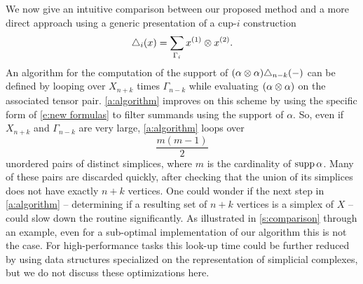 We now give an intuitive comparison between our proposed method and a more direct approach using a generic presentation of a cup-$i$ construction
\[
\triangle_i(x) =
\sum_{\Gamma_i} x^{(1)} \otimes x^{(2)}.
\]
An algorithm for the computation of the support of $(\alpha \otimes \alpha) \triangle_{n-k}(-)$ can be defined by looping over $X_{n+k}$ times $\Gamma_{n-k}$ while evaluating $(\alpha \otimes \alpha)$ on the associated tensor pair.
\cref{a:algorithm} improves on this scheme by using the specific form of \eqref{e:new formulas} to filter summands using the support of $\alpha$.
So, even if $X_{n+k}$ and $\Gamma_{n-k}$ are very large, \cref{a:algorithm} loops over
\[
\frac{m(m-1)}{2}
\]
unordered pairs of distinct simplices, where $m$ is the cardinality of $\operatorname{supp} \alpha$.
Many of these pairs are discarded quickly, after checking that the union of its simplices does not have exactly $n+k$ vertices.
One could wonder if the next step in \cref{a:algorithm} -- determining if a resulting set of $n+k$ vertices is a simplex of $X$ -- could slow down the routine significantly.
As illustrated in \cref{s:comparison} through an example, even for a sub-optimal implementation of our algorithm this is not the case.
For high-performance tasks this look-up time could be further reduced by using data structures specialized on the representation of simplicial complexes, but we do not discuss these optimizations here.